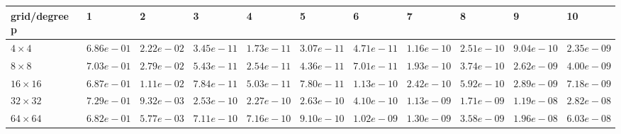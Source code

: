 \begin{tabular}{lllllllllll}
\hline
 grid/degree p   & 1          & 2          & 3          & 4          & 5          & 6          & 7          & 8          & 9          & 10         \\
\hline
 $4 \times 4$    & $6.86e-01$ & $2.22e-02$ & $3.45e-11$ & $1.73e-11$ & $3.07e-11$ & $4.71e-11$ & $1.16e-10$ & $2.51e-10$ & $9.04e-10$ & $2.35e-09$ \\
 $8 \times 8$    & $7.03e-01$ & $2.79e-02$ & $5.43e-11$ & $2.54e-11$ & $4.36e-11$ & $7.01e-11$ & $1.93e-10$ & $3.74e-10$ & $2.62e-09$ & $4.00e-09$ \\
 $16 \times 16$  & $6.87e-01$ & $1.11e-02$ & $7.84e-11$ & $5.03e-11$ & $7.80e-11$ & $1.13e-10$ & $2.42e-10$ & $5.92e-10$ & $2.89e-09$ & $7.18e-09$ \\
 $32 \times 32$  & $7.29e-01$ & $9.32e-03$ & $2.53e-10$ & $2.27e-10$ & $2.63e-10$ & $4.10e-10$ & $1.13e-09$ & $1.71e-09$ & $1.19e-08$ & $2.82e-08$ \\
 $64 \times 64$  & $6.82e-01$ & $5.77e-03$ & $7.11e-10$ & $7.16e-10$ & $9.10e-10$ & $1.02e-09$ & $1.30e-09$ & $3.58e-09$ & $1.96e-08$ & $6.03e-08$ \\
\hline
\end{tabular}